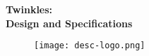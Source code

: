 \documentclass[12pt]{report}
\newcommand{\docheader}{{Twinkles:\\ \vspace{\baselineskip} Design and Specifications}}
\begin{document}
\pagestyle{empty}

\vspace*{0.3\textheight}

\begin{center}
{\Huge\bfseries \docheader}
\end{center}

\begin{figure}[!b]
\centering\texttt{[image: desc-logo.png]}
\end{figure}

\clearpage
\maketoc
\label{toc}

\pagestyle{fancy}
\fancyfoot{} %
\fancyfoot[R]{\thepage}  %

\fancyhead[L]{}
\fancyhead[R]{\descheader}
\renewcommand{\footrulewidth}{1pt}











% 



% 

% 




\end{document}
